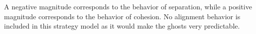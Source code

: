 \documentclass{llncs}
\begin{document}





A negative magnitude corresponds to the behavior of separation, while a positive magnitude corresponds to the behavior of cohesion. No alignment behavior is included in this strategy model as it would make the ghosts very predictable.
\end{document}
